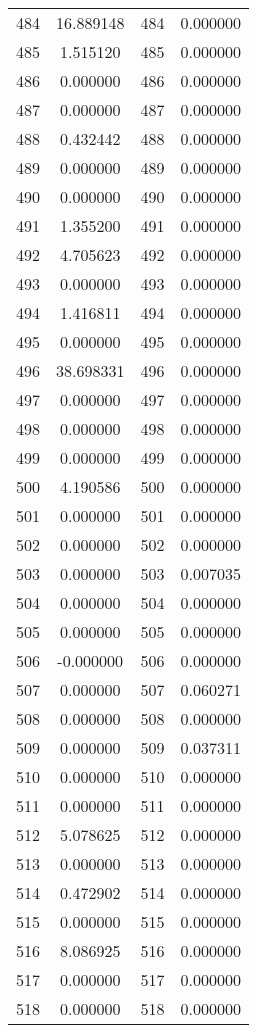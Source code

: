 \documentclass[12pt]{article}
\begin{document}
\begin{longtable}{@{}cccc@{}}
484 & 16.889148 & 484 & 0.000000 \\
485 & 1.515120 & 485 & 0.000000 \\
486 & 0.000000 & 486 & 0.000000 \\
487 & 0.000000 & 487 & 0.000000 \\
488 & 0.432442 & 488 & 0.000000 \\
489 & 0.000000 & 489 & 0.000000 \\
490 & 0.000000 & 490 & 0.000000 \\
491 & 1.355200 & 491 & 0.000000 \\
492 & 4.705623 & 492 & 0.000000 \\
493 & 0.000000 & 493 & 0.000000 \\
494 & 1.416811 & 494 & 0.000000 \\
495 & 0.000000 & 495 & 0.000000 \\
496 & 38.698331 & 496 & 0.000000 \\
497 & 0.000000 & 497 & 0.000000 \\
498 & 0.000000 & 498 & 0.000000 \\
499 & 0.000000 & 499 & 0.000000 \\
500 & 4.190586 & 500 & 0.000000 \\
501 & 0.000000 & 501 & 0.000000 \\
502 & 0.000000 & 502 & 0.000000 \\
503 & 0.000000 & 503 & 0.007035 \\
504 & 0.000000 & 504 & 0.000000 \\
505 & 0.000000 & 505 & 0.000000 \\
506 & -0.000000 & 506 & 0.000000 \\
507 & 0.000000 & 507 & 0.060271 \\
508 & 0.000000 & 508 & 0.000000 \\
509 & 0.000000 & 509 & 0.037311 \\
510 & 0.000000 & 510 & 0.000000 \\
511 & 0.000000 & 511 & 0.000000 \\
512 & 5.078625 & 512 & 0.000000 \\
513 & 0.000000 & 513 & 0.000000 \\
514 & 0.472902 & 514 & 0.000000 \\
515 & 0.000000 & 515 & 0.000000 \\
516 & 8.086925 & 516 & 0.000000 \\
517 & 0.000000 & 517 & 0.000000 \\
518 & 0.000000 & 518 & 0.000000 \\

\end{longtable}
\end{document}
